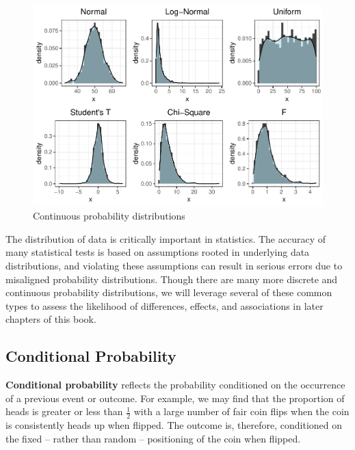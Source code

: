 \documentclass[
]{book}
\begin{document}
\begin{figure}

{\centering \includegraphics{The_Fundamentals_of_People_Analytics_files/figure-latex/continous-dist-1} 

}

\caption{Continuous probability distributions}\label{fig:continous-dist}
\end{figure}

The distribution of data is critically important in statistics. The accuracy of many statistical tests is based on assumptions rooted in underlying data distributions, and violating these assumptions can result in serious errors due to misaligned probability distributions. Though there are many more discrete and continuous probability distributions, we will leverage several of these common types to assess the likelihood of differences, effects, and associations in later chapters of this book.

\hypertarget{conditional-probability}{%
\subsection{Conditional Probability}\label{conditional-probability}}

\textbf{Conditional probability} reflects the probability conditioned on the occurrence of a previous event or outcome. For example, we may find that the proportion of heads is greater or less than \(\frac{1}{2}\) with a large number of fair coin flips when the coin is consistently heads up when flipped. The outcome is, therefore, conditioned on the fixed -- rather than random -- positioning of the coin when flipped.
\end{document}
